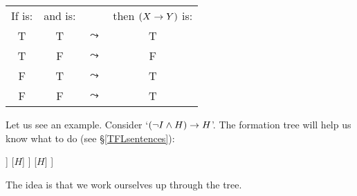 {\begin{enumerate}
\begin{center}
			\begin{tabular}{cccc}
				If \metaX is:&and \metaY is:&&then $(X\rightarrow Y)$ is:\\
				T & T &$\leadsto$& T\\
				T & F &$\leadsto$& F\\
				F & T &$\leadsto$& T\\
				F & F &$\leadsto$& T
			\end{tabular}
		\end{center}
	\end{enumerate}
}


Let us see an example. Consider 
`$(\neg I\mathbin{\wedge} H)\rightarrow H$'. 
The formation tree will help us know what to do (see \S\ref{TFLsentences}):
\begin{center}
	\begin{forest}
		[$(\enot I\eand H)\mainconnective{\eif} H$
		[$(\enot I\mainconnective{\eor} H)$
		[$\mainconnective{\enot} I$
		[$I$]
		]
		[$H$]
		]
		[$H$]
		]
	\end{forest}
\end{center}
The idea is that we work ourselves up through the tree.
%
%		

